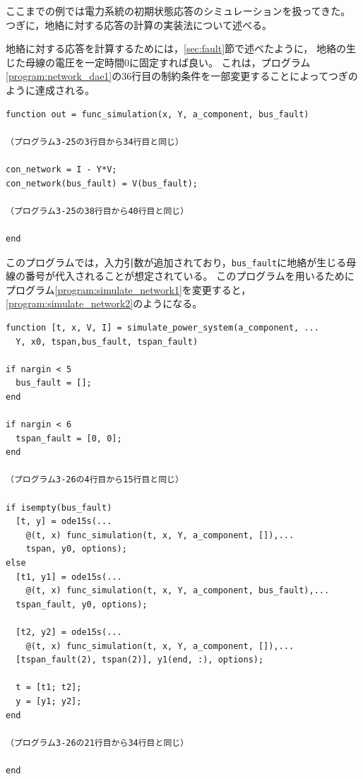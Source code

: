 \documentclass[tombow,dvipdfmx]{corona-a5-1.1}
\begin{document}
ここまでの例では電力系統の初期状態応答のシミュレーションを扱ってきた。
つぎに，地絡に対する応答の計算の実装法について述べる。
\begin{例}[地絡に対する応答のシミュレーション]
地絡に対する応答を計算するためには，\ref{sec:fault}節で述べたように，
地絡の生じた母線の電圧を一定時間$0$に固定すれば良い。
これは，プログラム\nobreak\ref{program:network_dae1}の36行目の制約条件を一部変更することによってつぎのように達成される。
\begin{PROGRAMA}[count,title={func\_simulation.m}]\label{program:network_dae_fault}
\begin{verbatim}
function out = func_simulation(x, Y, a_component, bus_fault)

（プログラム3-25の3行目から34行目と同じ）

con_network = I - Y*V;
con_network(bus_fault) = V(bus_fault);

（プログラム3-25の38行目から40行目と同じ）

end
\end{verbatim}
\end{PROGRAMA}
このプログラムでは，入力引数が追加されており，\verb|bus_fault|に地絡が生じる母線の番号が代入されることが想定されている。
このプログラムを用いるためにプログラム\nobreak\ref{program:simulate_network1}を変更すると，\ref{program:simulate_network2}のようになる。
\begin{PROGRAMA}[count,title={simulate\_power\_system.m}]\label{program:simulate_network2}
  \begin{verbatim}
function [t, x, V, I] = simulate_power_system(a_component, ...
  Y, x0, tspan,bus_fault, tspan_fault)

if nargin < 5
  bus_fault = [];
end

if nargin < 6
  tspan_fault = [0, 0];
end

（プログラム3-26の4行目から15行目と同じ）

if isempty(bus_fault)
  [t, y] = ode15s(...
    @(t, x) func_simulation(t, x, Y, a_component, []),...
    tspan, y0, options);
else
  [t1, y1] = ode15s(...
    @(t, x) func_simulation(t, x, Y, a_component, bus_fault),...
  tspan_fault, y0, options);
  
  [t2, y2] = ode15s(...
    @(t, x) func_simulation(t, x, Y, a_component, []),...
  [tspan_fault(2), tspan(2)], y1(end, :), options);

  t = [t1; t2];
  y = [y1; y2];
end

（プログラム3-26の21行目から34行目と同じ）

end
\end{verbatim}
\end{PROGRAMA}


\end{例}
\end{document}
